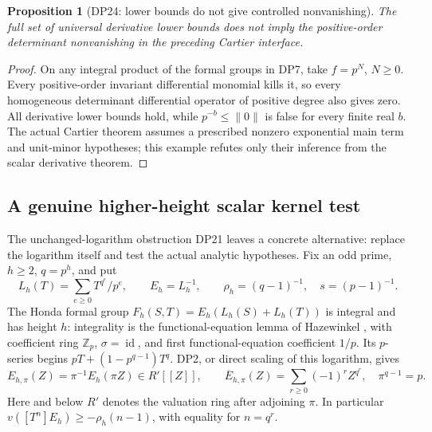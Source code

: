 \documentclass[11pt,a4paper]{article}
\newtheorem{proposition}[theorem]{Proposition}
\theoremstyle{definition}\newtheorem{remark}[theorem]{Remark}
\newcommand{\Z}{\mathbb Z}\newcommand{\Q}{\mathbb Q}\newcommand{\F}{\mathbb F}
\newcommand{\id}{\operatorname{id}}\newcommand{\Hom}{\operatorname{Hom}}
\begin{document}
\begin{proposition}[DP24: lower bounds do not give controlled nonvanishing]\label{DP24}
The full set of universal derivative lower bounds does not imply the positive-order determinant nonvanishing in the preceding Cartier interface.
\end{proposition}
\begin{proof}
On any integral product of the formal groups in DP7, take $f=p^N$, $N\ge0$. Every positive-order invariant differential monomial kills it, so every homogeneous determinant differential operator of positive degree also gives zero. All derivative lower bounds hold, while $p^{-b}\le\lVert0\rVert$ is false for every finite real $b$. The actual Cartier theorem assumes a prescribed nonzero exponential main term and unit-minor hypotheses; this example refutes only their inference from the scalar derivative theorem.
\end{proof}

\subsection{A genuine higher-height scalar kernel test}\label{sec:kerneltest}

The unchanged-logarithm obstruction DP21 leaves a concrete alternative: replace the logarithm itself and test the actual analytic hypotheses. Fix an odd prime, $h\ge2$, $q=p^h$, and put
\[
 L_h(T)=\sum_{e\ge0}T^{q^e}/p^e,\qquad E_h=L_h^{-1},\qquad
 \rho_h=(q-1)^{-1},\quad s=(p-1)^{-1}.
\]
The Honda formal group $F_h(S,T)=E_h(L_h(S)+L_h(T))$ is integral and has height $h$: integrality is the functional-equation lemma of Hazewinkel \cite[Lemma 2.3 and (2.5), p.~74]{Hazewinkel}, with coefficient ring $\Z_p$, $\sigma=\id$, and first functional-equation coefficient $1/p$. Its $p$-series begins $pT+(1-p^{q-1})T^q$. DP2, or direct scaling of this logarithm, gives
\begin{equation}\label{eq:honda-scale}
 E_{h,\pi}(Z)=\pi^{-1}E_h(\pi Z)\in R'[[Z]],\qquad
 \overline E_{h,\pi}(Z)=\sum_{r\ge0}(-1)^rZ^{q^r},\quad \pi^{q-1}=p.
\end{equation}
Here and below $R'$ denotes the valuation ring after adjoining $\pi$. In particular $v([T^n]E_h)\ge-\rho_h(n-1)$, with equality for $n=q^r$.
\end{document}
